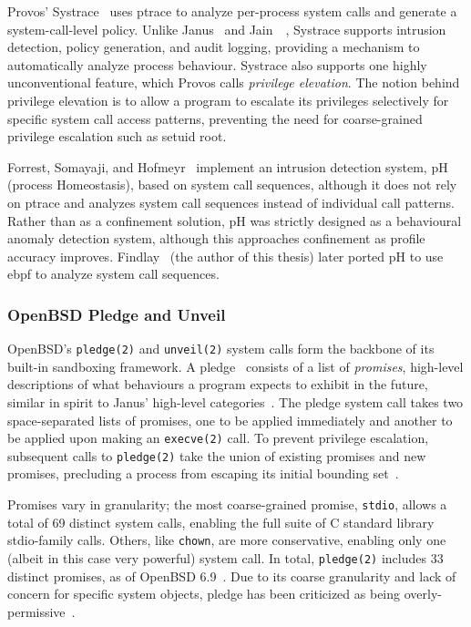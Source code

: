 Provos' Systrace~\cite{provos2003_systrace} uses ptrace to analyze per-process system
calls and generate a system-call-level policy. Unlike Janus~\cite{goldberg96_janus,
wagner1999_janus} and Jain~\etal~\cite{jain2000_filtering}, Systrace supports intrusion
detection, policy generation, and audit logging, providing a mechanism to automatically
analyze process behaviour. Systrace also supports one highly unconventional feature, which
Provos calls \textit{privilege elevation}. The notion behind privilege elevation is to
allow a program to escalate its privileges selectively for specific system call access
patterns, preventing the need for coarse-grained privilege escalation such as setuid root.

Forrest, Somayaji, and Hofmeyr~\cite{forrest1996_sense_of_self} implement an intrusion
detection system, pH (process Homeostasis), based on system call sequences, although it
does not rely on ptrace and analyzes system call sequences instead of individual call
patterns. Rather than as a confinement solution, pH was strictly designed as a behavioural
anomaly detection system, although this approaches confinement as profile accuracy
improves.  Findlay~\cite{findlay2020_ebph} (the author of this thesis) later ported pH to
use \gls{ebpf} to analyze system call sequences.

\subsubsection*{OpenBSD Pledge and Unveil}
\label{sss:pledge}

OpenBSD's \texttt{pledge(2)} and \texttt{unveil(2)} system calls form the backbone of its
built-in sandboxing framework. A pledge~\cite{pledge} consists of a list of
\textit{promises}, high-level descriptions of what behaviours a program expects to exhibit
in the future, similar in spirit to Janus' high-level categories~\cite{goldberg96_janus,
wagner1999_janus}. The pledge system call takes two space-separated lists of promises, one
to be applied immediately and another to be applied upon making an \texttt{execve(2)}
call. To prevent privilege escalation, subsequent calls to \texttt{pledge(2)} take the
union of existing promises and new promises, precluding a process from escaping its
initial bounding set~\cite{pledge}.

Promises vary in granularity; the most coarse-grained promise, \texttt{stdio}, allows
a total of 69 distinct system calls, enabling the full suite of C standard library
stdio-family calls. Others, like \texttt{chown}, are more conservative, enabling only one
(albeit in this case very powerful) system call. In total, \texttt{pledge(2)} includes 33
distinct promises, as of OpenBSD 6.9~\cite{pledge}. Due to its coarse granularity and lack
of concern for specific system objects, pledge has been criticized as being
overly-permissive~\cite{anderson2017_comparison}.

